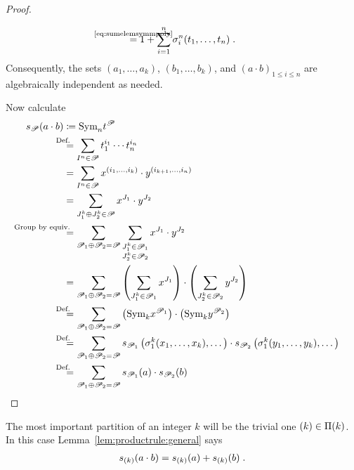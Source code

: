 \begin{Lem}
\begin{proof}
\begin{itemize}
\begin{align*}
            \cequalsby{\eqref{eq:sumelemsymmpoly}}
            1 + \sum_{i=1}^n \el i n (t_1,\dotsc,t_n)
            \;.
      \end{align*}
      Consequently, the sets 
      $(a_1,\dotsc,a_k)$, $(b_1,\dotsc,b_k)$, and
      $(a\cdot b)_{1\leq i\leq n}$ are algebraically independent as
      needed.
    \end{itemize}
    Now calculate
    \begin{align*}
      \s{\Part}(a\cdot b)
      &\coloneqq
        \symm{n} t^{\Part}
      \\ &\equalsby{Def.}
           \sum_{I^n\in\Part}
           t_1^{i_1}\dotsm t_n^{i_n}
      \\ &=
           \sum_{I^n\in\Part}
           x^{(i_1,\dotsc,i_k)}\cdot y^{(i_{k+1},\dotsc,i_n)}
      \\ &=
           \sum_{J_1^k\concat J_2^k\in\Part}
           x^{J_1} \cdot y^{J_2}
      \\ &\equalsby{Group by equiv.}
           \sum_{\Part_1\concat \Part_2=\Part}
           \sum_{\substack{J_1^k\in\Part_1\\ J_2^k\in\Part_2}}
      x^{J_1} \cdot y^{J_2}
      \\ &=
           \sum_{\Part_1\concat \Part_2=\Part}
           \left(\sum_{J_1^k\in\Part_1} x^{J_1}\right)
           \cdot
           \left(\sum_{J_2^k\in\Part_2} y^{J_2}\right)
      \\ &\equalsby{Def.}
           \sum_{\Part_1\concat \Part_2=\Part}
           \left(\symm{k} x^{\Part_1}\right)
           \cdot
           \left(\symm{k} y^{\Part_2}\right)
      \\ &\equalsby{Def.}
           \sum_{\Part_1\concat \Part_2=\Part}
           \s{\Part_1}\left( \el 1 k(x_1,\dotsc,x_k),\dotsc \right)
           \cdot
           \s{\Part_2}\left( \el 1 k(y_1,\dotsc,y_k),\dotsc \right)
      \\ &\equalsby{Def.}
           \sum_{\Part_1\concat \Part_2=\Part}
           \s{\Part_1}(a) \cdot \s{\Part_2}(b)
           \qedhere
    \end{align*}
  \end{proof}
\end{Lem}

\begin{Ex}
  The most important partition of an integer $k$ will be the trivial
  one $(k)\in\Pi({k})$. In this case
  Lemma~\ref{lem:productrule:general} says
  \begin{gather*}
    s_{(k)}(a\cdot b) = s_{(k)}(a) + s_{(k)}(b)
    \;.
  \end{gather*}
\end{Ex}


